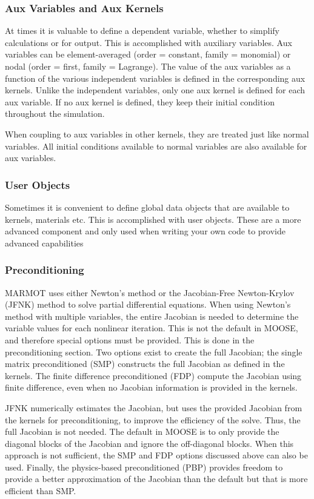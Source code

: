\documentclass[letter,12pt,fleqn]{article}
\begin{document}
\subsubsection{Aux Variables and Aux Kernels}

At times it is valuable to define a dependent variable, whether to simplify calculations or for output. This is accomplished with auxiliary variables. Aux variables can be element-averaged (order = constant, family = monomial) or nodal (order = first, family = Lagrange). The value of the aux variables as a function of the various independent variables is defined in the corresponding aux kernels. Unlike the independent variables, only one aux kernel is defined for each aux variable. If no aux kernel is defined, they keep their initial condition throughout the simulation.

When coupling to aux variables in other kernels, they are treated just like normal variables. All initial conditions available to normal variables are also available for aux variables.

\subsubsection{User Objects}

Sometimes it is convenient to define global data objects that are available to kernels, materials etc. This is accomplished with user objects. These are a more advanced component and only used when writing your own code to provide advanced capabilities

\subsubsection{Preconditioning}

MARMOT uses either Newton's method or the Jacobian-Free Newton-Krylov (JFNK) method to solve partial differential equations. When using Newton's method with multiple variables, the entire Jacobian is needed to determine the variable values for each nonlinear iteration. This is not the default in MOOSE, and therefore special options must be provided. This is done in the preconditioning section. Two options exist to create the full Jacobian; the single matrix preconditioned (SMP) constructs the full Jacobian as defined in the kernels. The finite difference preconditioned (FDP) compute the Jacobian using finite difference, even when no Jacobian information is provided in the kernels. 

JFNK numerically estimates the Jacobian, but uses the provided Jacobian from the kernels for preconditioning, to improve the efficiency of the solve. Thus, the full Jacobian is not needed. The default in MOOSE is to only provide the diagonal blocks of the Jacobian and ignore the off-diagonal blocks. When this approach is not sufficient, the SMP and FDP options discussed above can also be used. Finally, the physics-based preconditioned (PBP) provides freedom to provide a better approximation of the Jacobian than the default but that is more efficient than SMP.  
\end{document}
